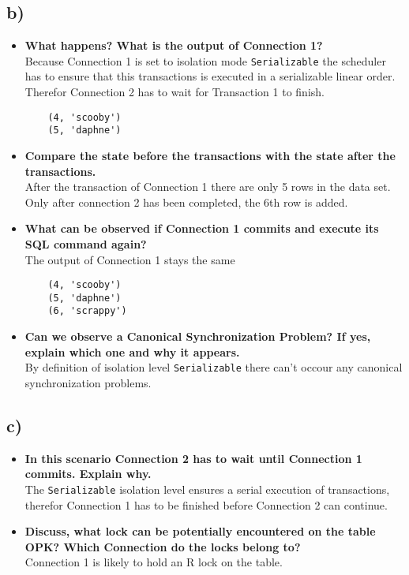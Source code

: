 \documentclass[a4paper,english,abstract=on]{scrartcl}
\begin{document}
\subsection*{b)}
	\begin{itemize}
		\item \textbf{What happens? What is the output of Connection 1?}\\
	Because Connection 1 is set to isolation mode \texttt{Serializable} the scheduler has to ensure that this transactions is executed in a serializable linear order. Therefor Connection 2 has to wait for Transaction 1 to finish. 
	\begin{lstlisting}
	(4, 'scooby')
	(5, 'daphne')
	\end{lstlisting}
	\item \textbf{Compare the state before the transactions with the state after the transactions.}\\
	After the transaction of Connection 1 there are only 5 rows in the data set. Only after connection 2 has been completed, the 6th row is added.
	\item \textbf{What can be observed if Connection 1 commits and execute its SQL command again?}\\
	The output of Connection 1 stays the same
	\begin{lstlisting}
	(4, 'scooby')
	(5, 'daphne')
	(6, 'scrappy')
	\end{lstlisting}
	\item \textbf{Can we observe a Canonical Synchronization Problem? If yes, explain which one and why it appears.}\\
	By definition of isolation level \texttt{Serializable} there can't occour any canonical synchronization problems.
\end{itemize}

\subsection*{c)}
\begin{itemize}
	\item \textbf{In this scenario Connection 2 has to wait until Connection 1 commits. Explain why.}\\
	The \texttt{Serializable} isolation level ensures a serial execution of transactions, therefor Connection 1 has to be finished before Connection 2 can continue.
	\item \textbf{Discuss, what lock can be potentially encountered on the table OPK? Which Connection do the locks belong to?}\\
	Connection 1 is likely to hold an R lock on the table.
\end{itemize}
\end{document}
